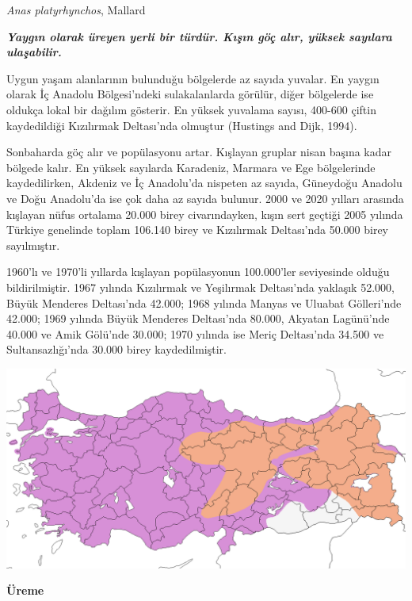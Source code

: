 \documentclass[
  a4paper,
  DIV=11,
  numbers=noendperiod]{scrartcl}
\begin{document}
\emph{Anas platyrhynchos}, Mallard

\textbf{\emph{Yaygın olarak üreyen yerli bir türdür. Kışın göç alır,
yüksek sayılara ulaşabilir.}}

Uygun yaşam alanlarının bulunduğu bölgelerde az sayıda yuvalar. En
yaygın olarak İç Anadolu Bölgesi'ndeki sulakalanlarda görülür, diğer
bölgelerde ise oldukça lokal bir dağılım gösterir. En yüksek yuvalama
sayısı, 400-600 çiftin kaydedildiği Kızılırmak Deltası'nda olmuştur
(Hustings and Dijk, 1994).

Sonbaharda göç alır ve popülasyonu artar. Kışlayan gruplar nisan başına
kadar bölgede kalır. En yüksek sayılarda Karadeniz, Marmara ve Ege
bölgelerinde kaydedilirken, Akdeniz ve İç Anadolu'da nispeten az sayıda,
Güneydoğu Anadolu ve Doğu Anadolu'da ise çok daha az sayıda bulunur.
2000 ve 2020 yılları arasında kışlayan nüfus ortalama 20.000 birey
civarındayken, kışın sert geçtiği 2005 yılında Türkiye genelinde toplam
106.140 birey ve Kızılırmak Deltası'nda 50.000 birey sayılmıştır.

1960'lı ve 1970'li yıllarda kışlayan popülasyonun 100.000'ler
seviyesinde olduğu bildirilmiştir. 1967 yılında Kızılırmak ve Yeşilırmak
Deltası'nda yaklaşık 52.000, Büyük Menderes Deltası'nda 42.000; 1968
yılında Manyas ve Uluabat Gölleri'nde 42.000; 1969 yılında Büyük
Menderes Deltası'nda 80.000, Akyatan Lagünü'nde 40.000 ve Amik Gölü'nde
30.000; 1970 yılında ise Meriç Deltası'nda 34.500 ve Sultansazlığı'nda
30.000 birey kaydedilmiştir.

\includegraphics{images/harita_Anas platyrhynchos.png}

\textbf{Üreme}
\end{document}
